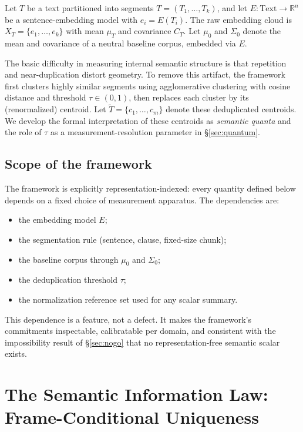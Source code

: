 \documentclass[11pt]{article}
\begin{document}
Let $T$ be a text partitioned into segments $T = (T_1, \dots, T_k)$, and let $E : \text{Text} \to \mathbb{R}^n$ be a sentence-embedding model with $e_i = E(T_i)$. The raw embedding cloud is $X_T = \{e_1, \dots, e_k\}$ with mean $\mu_T$ and covariance $C_T$. Let $\mu_0$ and $\Sigma_0$ denote the mean and covariance of a neutral baseline corpus, embedded via $E$.

The basic difficulty in measuring internal semantic structure is that repetition and near-duplication distort geometry. To remove this artifact, the framework first clusters highly similar segments using agglomerative clustering with cosine distance and threshold $\tau \in (0,1)$, then replaces each cluster by its (renormalized) centroid. Let $\tilde{T} = \{c_1, \dots, c_m\}$ denote these deduplicated centroids. We develop the formal interpretation of these centroids as \emph{semantic quanta} and the role of $\tau$ as a measurement-resolution parameter in \S\ref{sec:quantum}.

\subsection{Scope of the framework}\label{sec:scope}

The framework is explicitly representation-indexed: every quantity defined below depends on a fixed choice of measurement apparatus. The dependencies are:

\begin{itemize}
\item the embedding model $E$;
\item the segmentation rule (sentence, clause, fixed-size chunk);
\item the baseline corpus through $\mu_0$ and $\Sigma_0$;
\item the deduplication threshold $\tau$;
\item the normalization reference set used for any scalar summary.
\end{itemize}

This dependence is a feature, not a defect. It makes the framework's commitments inspectable, calibratable per domain, and consistent with the impossibility result of \S\ref{sec:nogo} that no representation-free semantic scalar exists.

\section{The Semantic Information Law: Frame-Conditional Uniqueness}\label{sec:sil}
\end{document}

